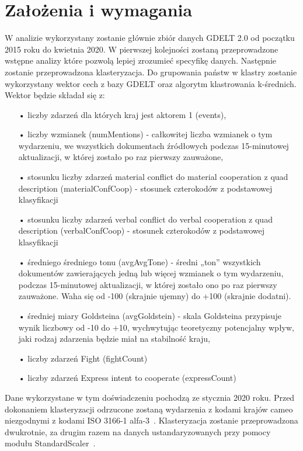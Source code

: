 \documentclass[11pt]{report}
\begin{document}
    \section{Założenia i wymagania}\label{sec:założenia-i-wymagania}
    W analizie wykorzystany zostanie głównie zbiór danych GDELT 2.0 od początku 2015 roku do kwietnia 2020.
    W pierwszej kolejności zostaną przeprowadzone wstępne analizy które pozwolą lepiej zrozumieć specyfikę danych.
    Następnie zostanie przeprowadzona klasteryzacja.
    Do grupowania państw w klastry zostanie wykorzystany wektor cech z bazy GDELT oraz algorytm klastrowania k-średnich.
    Wektor będzie składał się z:
    \begin{enumerate}
        \item[•] liczby zdarzeń dla których kraj jest aktorem 1 (events),
        \item[•] liczby wzmianek (numMentions) - całkowitej liczba wzmianek o tym wydarzeniu, we wszystkich dokumentach źródłowych podczas 15-minutowej aktualizacji, w której zostało po raz pierwszy zauważone,
        \item[•] stosunku liczby zdarzeń material conflict do material cooperation z quad description (materialConfCoop) - stosunek czterokodów z podstawowej klasyfikacji
        \item[•] stosunku liczby zdarzeń verbal conflict do verbal cooperation z quad description (verbalConfCoop) - stosunek czterokodów z podstawowej klasyfikacji
        \item[•] średniego średniego tonu (avgAvgTone) - średni „ton” wszystkich dokumentów zawierających jedną lub więcej wzmianek o tym wydarzeniu, podczas 15-minutowej aktualizacji, w której zostało ono po raz pierwszy zauważone. Waha się od -100 (skrajnie ujemny) do +100 (skrajnie dodatni).
        \item[•] średniej miary Goldsteina (avgGoldstein) - skala Goldsteina przypisuje wynik liczbowy od -10 do +10, wychwytując teoretyczny potencjalny wpływ, jaki rodzaj zdarzenia będzie miał na stabilność kraju,
        \item[•] liczby zdarzeń Fight (fightCount)
        \item[•] liczby zdarzeń Express intent to cooperate (expressCount)
    \end{enumerate}
    Dane wykorzystane w tym doświadczeniu pochodzą ze stycznia 2020 roku.
    Przed dokonaniem klasteryzacji odrzucone zostaną wydarzenia z kodami krajów cameo niezgodnymi z kodami ISO 3166-1 alfa-3~\cite{iso_alfa3}.
    Klasteryzacja zostanie przeprowadzona dwukrotnie, za drugim razem na danych ustandaryzowanych przy pomocy modułu StandardScaler~\cite{standardScaler}.
\end{document}
